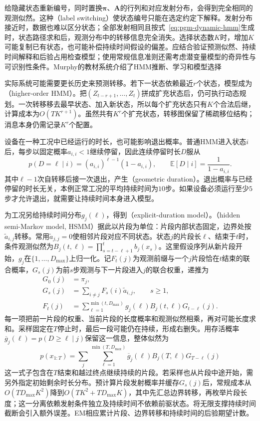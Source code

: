 给隐藏状态重新编号，同时置换$\bm{\pi}$、$\bm{A}$的行列和对应发射分布，会得到完全相同的观测似然。这种（label switching）使状态编号只能在选定约定下解释。发射分布接近时，数据也难以区分状态；全部发射相同且按式~\eqref{eq:pgm-dynamic-hmm}生成时，状态路径求和后，观测分布中的转移信息完全消失。选择状态数$K$时，增加$K$可能复制已有状态，也可能补偿持续时间假设的偏差。应结合验证预测似然、持续时间解释和后验占用检查模型；使用常规信息准则还需考虑潜变量模型的奇异性与可识别性条件。Murphy的教材系统介绍了HMM推断、学习和模型选择

实际系统可能需要更长历史来预测转移。若下一状态依赖最近$r$个状态，模型成为（higher-order HMM）。把$(Z_{t-r+1},\ldots,Z_t)$拼成扩充状态后，仍可执行动态规划。一次转移移去最早状态、加入新状态，所以每个扩充状态只有$K$个合法后继，计算成本为$O(TK^{r+1})$。虽然共有$K^r$个扩充状态，转移图保留了稀疏移位结构；消息本身仍需记录$K^r$个配置。

设备在一种工况中已经运行的时长，也可能影响退出概率。普通HMM进入状态$i$后，每步以固定概率$a_{i,i}<1$继续停留，因此连续停留时长$D$服从
\begin{equation}
  p(D=\ell\mid i)=(a_{i,i})^{\ell-1}(1-a_{i,i}),
  \qquad
  \mathbb{E}[D\mid i]=\frac{1}{1-a_{i,i}}.
  \label{eq:pgm-dynamic-geometric-duration}
\end{equation}
其中$\ell-1$次自转移后接一次退出，产生（geometric duration）。退出概率与已经停留的时长无关，本例正常工况的平均持续时间为$10$步。如果设备必须运行至少$5$步才允许退出，就需要让持续时间本身进入模型。

为工况另给持续时间分布$g_j(\ell)$，得到（explicit-duration model）。（hidden semi-Markov model, HSMM）据此以片段为单位：片段内部状态固定，边界处按$\widetilde a_{i,j}$转移。常用$\widetilde a_{j,j}=0$使相邻片段对应不同状态。状态$j$的片段长$\ell$、结束于$t$时，条件观测似然为$B_j(t,\ell)=\prod_{s=t-\ell+1}^{t}b_j(x_s)$。这里假设序列从新片段开始，$g_j$在$\{1,\ldots,D_{\max}\}$上归一化。记$F_t(j)$为观测前缀与一个$j$片段恰在$t$结束的联合概率，$G_s(j)$为前$s$步观测与下一片段进入$j$的联合权重，递推为
\begin{equation}
  \begin{aligned}
    G_0(j)&=\pi_j,\\
    G_s(j)&=\sum_{i\ne j}
      F_s(i)\widetilde a_{i,j},\qquad s\geq1,\\
    F_t(j)&=\sum_{\ell=1}^{\min(t,D_{\max})}
      g_j(\ell)B_j(t,\ell)G_{t-\ell}(j).
  \end{aligned}
  \label{eq:pgm-dynamic-hsmm}
\end{equation}
每一项把前一片段的权重、当前片段的长度概率和观测似然相乘，再对可能长度求和。采样固定在$T$停止时，最后一段可能仍在持续，形成右删失。用存活概率$\overline g_j(\ell)=p(D\geq\ell\mid j)$保留这一信息，整体似然为
\[
  p(x_{1:T})=\sum_j\sum_{\ell=1}^{\min(T,D_{\max})}
    \overline g_j(\ell)B_j(T,\ell)G_{T-\ell}(j)
\]
这一式子包含在$T$结束和越过终点继续持续的片段。若采样也从片段中途开始，需另外指定初始剩余时长分布。预计算片段发射概率并缓存$G_s(j)$后，常规成本从$O(TD_{\max}K^2)$降到$O(TK^2+TD_{\max}K)$，其中先汇总边界转移，再枚举片段长度；这一分离依赖发射条件独立及持续时间不依赖前驱状态。将无限支撑持续时间截断会引入额外误差。EM相应累计片段、边界转移和持续时间的后验期望计数。

